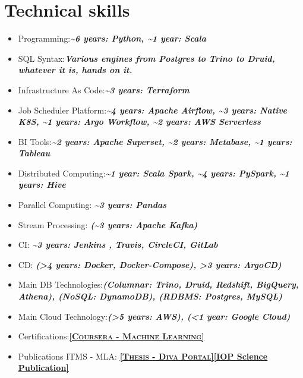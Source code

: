 \documentclass[10pt,a4paper,sans,colorlinks,linkcolor=blue,urlcolor=blue]{moderncv}
\begin{document}
\section{Technical skills}

\begin{itemize}
    \item Programming:\textbf{\textit{\textasciitilde6 years: Python, \textasciitilde1 year: Scala}}
    \item SQL Syntax:\textbf{\textit{Various engines from Postgres to Trino to Druid, whatever it is, hands on it.}}
    \item Infrastructure As Code:\textbf{\textit{\textasciitilde3 years: Terraform}}
    \item Job Scheduler Platform:\textbf{\textit{\textasciitilde4 years: Apache Airflow, \textasciitilde3 years: Native K8S, \textasciitilde1 years: Argo Workflow, \textasciitilde2 years: AWS Serverless}}
    \item BI Tools:\textbf{\textit{\textasciitilde2 years: Apache Superset, \textasciitilde2 years: Metabase, \textasciitilde1 years: Tableau}}
    \item Distributed Computing:\textbf{\textit{\textasciitilde1 year: Scala Spark, \textasciitilde4 years: PySpark, \textasciitilde1 years: Hive}}
    \item Parallel Computing: 
    \textbf{\textit{\textasciitilde3 years: Pandas}}
    \item Stream Processing: \textbf{\textit{(\textasciitilde3 years: Apache Kafka)}}
    \item CI: \textbf{\textit{\textasciitilde3 years: Jenkins , Travis, CircleCI, GitLab}}
    \item CD: \textbf{\textit{(>4 years: Docker, Docker-Compose), >3 years: ArgoCD)}}
    \item Main DB Technologies:\textbf{\textit{(Columnar: Trino, Druid, Redshift, BigQuery, Athena), (NoSQL: DynamoDB), (RDBMS: Postgres, MySQL)}}
    \item Main Cloud Technology:\textbf{\textit{(>5 years: AWS), (<1 year: Google Cloud)}}
    \item Certifications:\href{https://www.coursera.org/account/accomplishments/certificate/W5HM63ABYCDV}{\textbf{\textsc{\underline{[Coursera - Machine Learning]}}}}
    \item Publications ITMS - MLA\footnotemark[2]: \href{http://hh.diva-portal.org/smash/record.jsf?pid=diva2%3A1113511&dswid=4291#sthash.wwKv4JYI.dpbs}{\textbf{\textsc{\underline{[Thesis - Diva Portal]}}}}\href{http://iopscience.iop.org/article/10.1088/1757-899X/252/1/012018/pdf;jsessionid=EF9A9E415EC41D639019919DC566B21F.c4.iopscience.cld.iop.org}{\textbf{\underline{[IOP Science Publication]}}}
\end{itemize}
\end{document}

